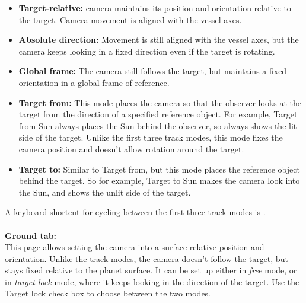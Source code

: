 \documentclass[Orbiter User Manual.tex]{subfiles}
\begin{document}
\begin{figure}[H]
	\centering
\end{figure}

\noindent

\begin{itemize}
\item \textbf{Target-relative:} camera maintains its position and orientation relative to the target. Camera movement is aligned with the vessel axes.
\item \textbf{Absolute direction:} Movement is still aligned with the vessel axes, but the camera keeps looking in a fixed direction even if the target is rotating.
\item \textbf{Global frame:} The camera still follows the target, but maintains a fixed orientation in a global frame of reference.
\item \textbf{Target from:} This mode places the camera so that the observer looks at the target from the direction of a specified reference object. For example, Target from Sun always places the Sun behind the observer, so always shows the lit side of the target. Unlike the first three track modes, this mode fixes the camera position and doesn't allow rotation around the target.
\item \textbf{Target to:} Similar to Target from, but this mode places the reference object behind the target. So for example, Target to Sun makes the camera look into the Sun, and shows the unlit side of the target.
\end{itemize}

\noindent
A keyboard shortcut for cycling between the first three track modes is .\\
\\
\textbf{Ground tab:}\\
This page allows setting the camera into a surface-relative position and orientation. Unlike the track modes, the camera doesn't follow the target, but stays fixed relative to the planet surface. It can be set up either in \textit{free} mode, or in \textit{target lock} mode, where it keeps looking in the direction of the target. Use the Target lock check box to choose between the two modes.

\begin{figure}[H]
	\centering
\end{figure}
\end{document}
